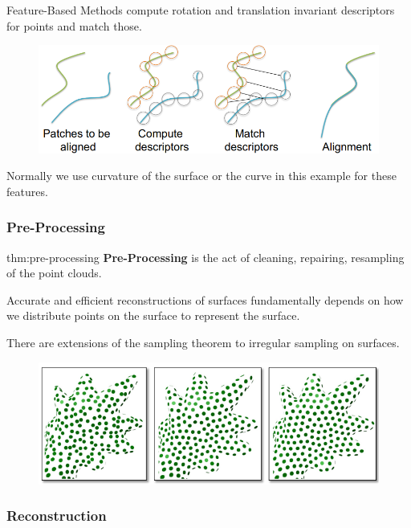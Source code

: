 \documentclass{article}
\begin{document}
Feature-Based Methods compute rotation and translation invariant descriptors for points and match those.

\begin{figure}[!ht]
    \centering
    \includegraphics[width=0.8\linewidth]{images/feature_based.png}
\end{figure}

Normally we use curvature of the surface or the curve in this example for these features.

\newpage

\subsubsection{Pre-Processing}

\vspace{5px}

\begin{defin}{thm:pre-processing}
    \textbf{Pre-Processing} is the act of cleaning, repairing, resampling of the point clouds.
\end{defin}


\vspace{5px}

Accurate and efficient reconstructions of surfaces fundamentally depends on how we distribute points on
the surface to represent the surface.

\vspace{5px}

There are extensions of the sampling theorem to irregular sampling on surfaces.

\begin{figure}[!ht]
    \centering
    \includegraphics[width=0.5\linewidth]{images/sampling_points.png}
\end{figure}


\subsubsection{Reconstruction}
\end{document}
